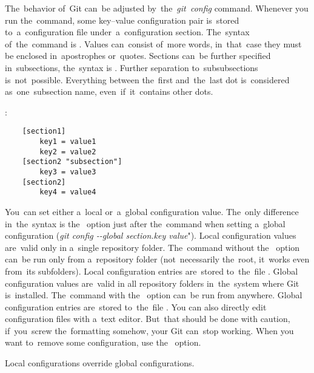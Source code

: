 \label{gitconfig}
The~behavior of~Git can~be adjusted by~the~\textit{git~config} command.
Whenever you run the~command, some key--value configuration pair is~stored to~a~configuration file under~a~configuration section.
The~syntax of~the~command is .
Values can~consist of~more words, in~that~case they must be enclosed in~apostrophes or~quotes.
Sections can~be further specified in~subsections, the~syntax is .
Further separation to~subsubsections is~not~possible.
Everything between the~first and~the~last dot is~considered as~one~subsection name, even~if~it~contains other dots.

:
\begin{lstlisting}
    [section1]
        key1 = value1
        key2 = value2
    [section2 "subsection"]
        key3 = value3
    [section2]
        key4 = value4
\end{lstlisting}
\newline

\enlargethispage{-8mm}
\noindent You~can set either a~local or~a~global configuration value.
The~only difference in~the~syntax is the~ option just after the~command when setting a~global configuration (\textit{git config \mbox{-{}-global} section.key value}").
Local configuration values are~valid only in a~single repository folder.
The~command without the~ option can~be run only from a~repository folder (not~necessarily the~root, it~works even from~its subfolders).
Local configuration entries are~stored to~the~file .
Global configuration values are~valid in all repository folders in~the~system where Git is~installed.
The~command with the~ option can~be run from anywhere.
Global configuration entries are~stored to~the~file .
You can also directly edit configuration files with a~text editor.
But~that should be done with caution, if~you~screw the~formatting somehow, your Git can~stop working.
When you want to~remove some configuration, use the~ option.

\warning Local configurations override global configurations.

